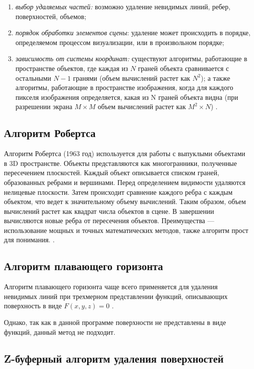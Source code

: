 \begin{enumerate}
	\item \textit{выбор удаляемых частей:} возможно удаление невидимых линий, ребер, поверхностей, объемов;
	\item \textit{порядок обработки элементов сцены}: удаление может происходить в порядке, определяемом процессом визуализации, или в произвольном порядке;
	\item\textit{зависимость от системы координат:} существуют алгоритмы, работающие в пространстве объектов, где каждая из $N$ граней объекта сравнивается с остальными $N - 1$ гранями (объем вычислений растет как $N^2$); а также алгоритмы, работающие в пространстве изображения, когда для каждого пикселя изображения определяется, какая из N граней объекта видна (при разрешении экрана $M\times{M}$ объем вычислений растет как $M^2 \times N$) \cite{del_line}.
\end{enumerate}

\subsection{Алгоритм Робертса}

Алгоритм Робертса (1963 год) используется для работы с выпуклыми объектами в 3D пространстве. Объекты представляются как многогранники, полученные пересечением плоскостей. Каждый объект описывается списком граней, образованных ребрами и вершинами. Перед определением видимости удаляются нелицевые плоскости. Затем происходит сравнение каждого ребра с каждым объектом, что ведет к значительному объему вычислений. Таким образом, объем вычислений растет как квадрат числа объектов в сцене. В завершении вычисляются новые ребра от пересечения объектов. Преимущества ---  использование мощных и точных математических методов, также алгоритм прост для понимания. \cite{del_line}. 

\subsection{Алгоритм плавающего горизонта}

Алгоритм плавающего горизонта чаще всего применяется для удаления невидимых линий при трехмерном представлении функций, описывающих поверхность в виде $F(x, y, z) = 0$ \cite{del_line}.

Однако, так как в данной программе поверхности не представлены в виде функций, данный метод не подходит.

\subsection{Z-буферный алгоритм удаления поверхностей}

